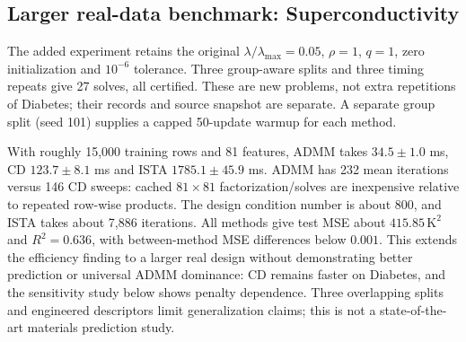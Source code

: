 \documentclass{article}
\newcommand{\realdir}{../outputs/realdata_20261120T093041Z}
\begin{document}
\subsection{Larger real-data benchmark: Superconductivity}
The added experiment retains the original $\lambda/\lambda_{\max}=0.05$, $\rho=1$, $q=1$, zero initialization and $10^{-6}$ tolerance. Three group-aware splits and three timing repeats give 27 solves, all certified. These are new problems, not extra repetitions of Diabetes; their records and source snapshot are separate. A separate group split (seed 101) supplies a capped 50-update warmup for each method.
\begin{table}[ht]
\centering\footnotesize
\caption{Superconductivity: median timing within split, then mean $\pm$ sample SD over three overlapping group-based splits. Targets remain in kelvin; MSE scales differ from Diabetes and synthetic data.}
\label{tab:realdata}
\end{table}
With roughly 15,000 training rows and 81 features, ADMM takes $34.5\pm1.0$ ms, CD $123.7\pm8.1$ ms and ISTA $1785.1\pm45.9$ ms. ADMM has 232 mean iterations versus 146 CD sweeps: cached $81\times81$ factorization/solves are inexpensive relative to repeated row-wise products. The design condition number is about 800, and ISTA takes about 7,886 iterations. All methods give test MSE about $415.85\,\mathrm{K}^2$ and $R^2=0.636$, with between-method MSE differences below $0.001$. This extends the efficiency finding to a larger real design without demonstrating better prediction or universal ADMM dominance: CD remains faster on Diabetes, and the sensitivity study below shows penalty dependence. Three overlapping splits and engineered descriptors limit generalization claims; this is not a state-of-the-art materials prediction study.
\end{document}
